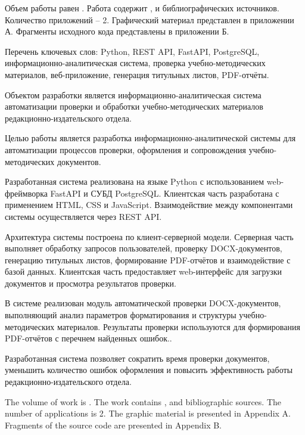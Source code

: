 
Объем работы равен . Работа содержит ,  
и  библиографических источников. Количество приложений – 2. Графический материал представлен в приложении А. Фрагменты исходного кода представлены в приложении Б.

Перечень ключевых слов: Python, REST API, FastAPI, PostgreSQL,
информационно-аналитическая система, проверка учебно-методических материалов, веб-приложение, генерация титульных листов, PDF-отчёты.

Объектом разработки является информационно-аналитическая система автоматизации проверки и обработки учебно-методических материалов редакционно-издательского отдела.

Целью работы является разработка информационно-аналитической системы для автоматизации процессов проверки, оформления и сопровождения учебно-методических документов.

Разработанная система реализована на языке Python с использованием web-фреймворка FastAPI и СУБД PostgreSQL. Клиентская часть разработана с применением HTML, CSS и JavaScript. Взаимодействие между компонентами системы осуществляется через REST API.

Архитектура системы построена по клиент-серверной модели. Серверная часть выполняет обработку запросов пользователей, проверку DOCX-документов, генерацию титульных листов, формирование PDF-отчётов и взаимодействие с базой данных. Клиентская часть предоставляет web-интерфейс для загрузки документов и просмотра результатов проверки.

В системе реализован модуль автоматической проверки DOCX-документов, выполняющий анализ параметров форматирования и структуры учебно-методических материалов. Результаты проверки используются для формирования PDF-отчётов с перечнем найденных ошибок..

Разработанная система позволяет сократить время проверки документов, уменьшить количество ошибок оформления и повысить эффективность работы редакционно-издательского отдела.




The volume of work is . The work contains , and  bibliographic sources. The number of applications is 2. The graphic material is presented in Appendix A. Fragments of the source code are presented in Appendix B.


